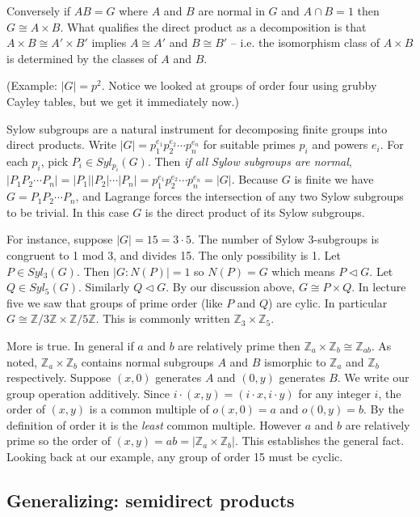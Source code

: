 \documentclass[letterpaper]{article}
\begin{document}
Conversely if $AB = G$ where $A$ and $B$ are normal in $G$ and $A
\cap B = 1$ then $G \cong A \times B$. What qualifies the direct
product as a decomposition is that $A \times B \cong A' \times B'$
implies $A \cong A'$ and $B \cong B'$ -- i.e. the isomorphism class
of $A \times B$ is determined by the classes of $A$ and $B$.

(Example: $|G| = p^2$. Notice we looked at groups of order four
using grubby Cayley tables, but we get it immediately now.)

Sylow subgroups are a natural instrument for decomposing finite
groups into direct products. Write $|G| = p_1^{e_1}p_2^{e_2}\cdots
p_n^{e_n}$ for suitable primes $p_i$ and powers $e_i$. For each
$p_i$, pick $P_i \in Syl_{p_i}(G)$. Then \emph{if all Sylow subgroups
are normal}, $|P_1P_2\cdots P_n| = |P_1||P_2|\cdots |P_n| =
p_1^{e_1}p_2^{e_2}\cdots p_n^{e_n} = |G|$. Because $G$ is finite
we have $G = P_1P_2\cdots P_n$, and Lagrange forces the intersection
of any two Sylow subgroups to be trivial. In this case $G$ is the
direct product of its Sylow subgroups.

For instance, suppose $|G| = 15 = 3\cdot 5$. The number of Sylow
3-subgroups is congruent to 1 mod 3, and divides 15. The only
possibility is 1. Let $P \in Syl_3(G)$. Then $|G \colon N(P)| = 1$
so $N(P) = G$ which means $P \lhd G$. Let $Q \in Syl_5(G)$. Similarly
$Q \lhd G$. By our discussion above, $G \cong P \times Q$. In lecture
five we saw that groups of prime order (like $P$ and $Q$) are cylic.
In particular $G \cong \mathbb{Z}/3\mathbb{Z} \times
\mathbb{Z}/5\mathbb{Z}$. This is commonly written $\mathbb{Z}_3
\times \mathbb{Z}_5$.

More is true. In general if $a$ and $b$ are relatively prime then
$\mathbb{Z}_a \times \mathbb{Z}_b \cong \mathbb{Z}_{ab}$. As noted,
$\mathbb{Z}_a \times \mathbb{Z}_b$ contains normal subgroups $A$
and $B$ ismorphic to $\mathbb{Z}_a$ and $\mathbb{Z}_b$ respectively.
Suppose $(x, 0)$ generates $A$ and $(0, y)$ generates $B$. We write
our group operation additively. Since $i \cdot (x, y) = (i \cdot
x, i \cdot y)$ for any integer $i$, the order of $(x, y)$ is a
common multiple of $o(x,0) = a$ and $o(0, y) = b$. By the definition
of order it is the \emph{least} common multiple. However $a$ and
$b$ are relatively prime so the order of $(x, y) = ab = |\mathbb{Z}_a
\times \mathbb{Z}_b|$. This establishes the general fact. Looking
back at our example, any group of order 15 must be cyclic.

\subsection{Generalizing: semidirect products}
\end{document}
